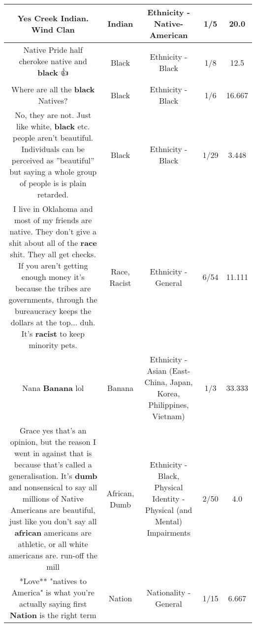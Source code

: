 \documentclass[11pt]{article}
\newlength\mylength
\begin{document}
\begin{center}
\begin{longtable}{|C{.65\mylength}|C{.30\mylength}|C{.12\mylength}|C{.12\mylength}|C{.12\mylength}|}
  \small Yes Creek \textbf{Indian}. Wind Clan\normalsize   & Indian & Ethnicity - Native-American & 1/5 & 20.0 \\  \hline
  \small Native Pride half cherokee native and \textbf{black} 👍\normalsize   & Black & Ethnicity - Black & 1/8 & 12.5 \\  \hline
  \small Where are all the \textbf{black} Natives?\normalsize   & Black & Ethnicity - Black & 1/6 & 16.667 \\  \hline
  \small No, they are not. Just like white, \textbf{black} etc. people aren't beautiful. Individuals can be perceived as ''beautiful'' but saying a whole group of people is is plain retarded.\normalsize   & Black & Ethnicity - Black & 1/29 & 3.448 \\  \hline
  \small I live in Oklahoma and most of my friends are native. They don't give a shit about all of the \textbf{race} shit. They all get checks. If you aren't getting enough money it's because the tribes are governments, through the bureaucracy keeps the dollars at the top... duh. It's \textbf{racist} to keep minority pets.\normalsize   & Race, Racist & Ethnicity - General & 6/54 & 11.111 \\  \hline
  \small Nana \textbf{Banana} lol\normalsize   & Banana & Ethnicity - Asian (East- China, Japan, Korea, Philippines, Vietnam) & 1/3 & 33.333 \\  \hline
  \small Grace yes that's an opinion, but the reason I went in against that is because that's called a generalisation. It's \textbf{dumb} and nonsensical to say all millions of Native Americans are beautiful, just like you don't say all \textbf{african} americans are athletic, or all white americans are. run-off the mill\normalsize   & African, Dumb & Ethnicity - Black, Physical Identity - Physical (and Mental) Impairments & 2/50 & 4.0 \\  \hline
  \small **Love** "natives to America" is what you're actually saying first \textbf{Nation} is the right term\normalsize   & Nation & Nationality - General & 1/15 & 6.667 \\  \hline

\end{longtable}
\end{center}
\end{document}

